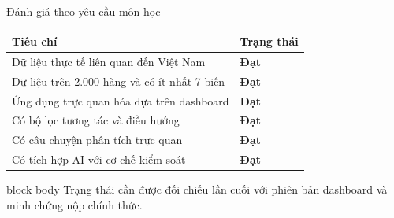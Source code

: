 \documentclass[aspectratio=169,11pt]{beamer}
\begin{document}
\begin{frame}{Đánh giá theo yêu cầu môn học}
  \small
  \begin{tabular}{@{}p{11.8cm}>{\centering\arraybackslash}p{2cm}@{}}
    \toprule
    \textbf{Tiêu chí} & \textbf{Trạng thái} \\
    \midrule
    Dữ liệu thực tế liên quan đến Việt Nam & \color{PrismBlue}\textbf{Đạt} \\
    Dữ liệu trên 2.000 hàng và có ít nhất 7 biến & \color{PrismBlue}\textbf{Đạt} \\
    Ứng dụng trực quan hóa dựa trên dashboard & \color{PrismBlue}\textbf{Đạt} \\
    Có bộ lọc tương tác và điều hướng & \color{PrismBlue}\textbf{Đạt} \\
    Có câu chuyện phân tích trực quan & \color{PrismBlue}\textbf{Đạt} \\
    Có tích hợp AI với cơ chế kiểm soát & \color{PrismBlue}\textbf{Đạt} \\
    \bottomrule
  \end{tabular}
  \vspace{0.4cm}
  \begin{beamercolorbox}[sep=0.2cm,rounded=true]{block body}
    Trạng thái cần được đối chiếu lần cuối với phiên bản dashboard và minh chứng nộp chính thức.
  \end{beamercolorbox}
\end{frame}
\end{document}
